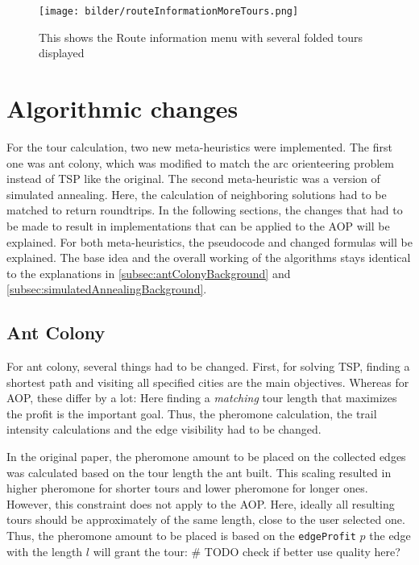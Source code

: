 \begin{figure}[H]
	\centering
	\texttt{[image: bilder/routeInformationMoreTours.png]}
	\caption{This shows the Route information menu with several folded tours displayed}
	\label{fig:actualFrontendToureInfoMenuMoreTours}
\end{figure}


\section{Algorithmic changes}
\label{sec:algorithmicChanges}

For the tour calculation, two new meta-heuristics were implemented.
The first one was ant colony, which was modified to match the arc orienteering problem instead of TSP like the original.
The second meta-heuristic was a version of simulated annealing.
Here, the calculation of neighboring solutions had to be matched to return roundtrips.
In the following sections, the changes that had to be made to result in implementations that can be applied to the AOP will be explained.
For both meta-heuristics, the pseudocode and changed formulas will be explained.
The base idea and the overall working of the algorithms stays identical to the explanations in \ref{subsec:antColonyBackground} and \ref{subsec:simulatedAnnealingBackground}.


\subsection{Ant Colony}
\label{subsec:antColonyImplementation}

For ant colony, several things had to be changed. 
First, for solving TSP, finding a shortest path and visiting all specified cities are the main objectives.
Whereas for AOP, these differ by a lot:
Here finding a \textit{matching} tour length that maximizes the profit is the important goal. 
Thus, the pheromone calculation, the trail intensity calculations and the edge visibility had to be changed.


In the original paper, the pheromone amount to be placed on the collected edges was calculated based on the tour length the ant built. 
This scaling resulted in higher pheromone for shorter tours and lower pheromone for longer ones.
However, this constraint does not apply to the AOP.
Here, ideally all resulting tours should be approximately of the same length, close to the user selected one.
Thus, the pheromone amount to be placed is based on the \texttt{edgeProfit} $p$ the edge with the length $l$ will grant the tour:
\# TODO check if better use quality here?

